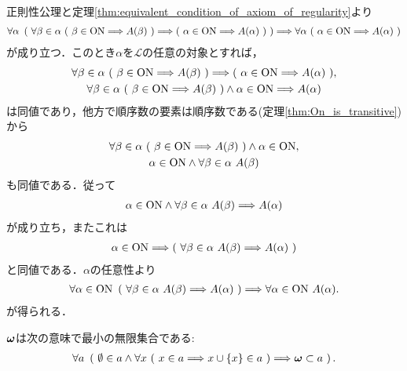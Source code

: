 	\begin{prf}
		正則性公理と定理\ref{thm:equivalent_condition_of_axiom_of_regularity}より
		\begin{align}
			\forall \alpha\ \left(\ \forall \beta \in \alpha\ (\ \beta \in \ON \Longrightarrow A(\beta)\ )
			\Longrightarrow (\ \alpha \in \ON \Longrightarrow A(\alpha)\ )\ \right)
			\Longrightarrow \forall \alpha\ (\ \alpha \in \ON \Longrightarrow A(\alpha)\ )
		\end{align}
		が成り立つ．このとき$\alpha$を$\mathcal{L}$の任意の対象とすれば，
		\begin{align}
			\begin{gathered}
				\forall \beta \in \alpha\ (\ \beta \in \mathrm{ON} \Longrightarrow A(\beta)\ )
				\Longrightarrow (\ \alpha \in \mathrm{ON} \Longrightarrow A(\alpha)\ ), \\
				\forall \beta \in \alpha\ (\ \beta \in \mathrm{ON} \Longrightarrow A(\beta)\ ) \wedge \alpha \in \mathrm{ON} \Longrightarrow A(\alpha)
			\end{gathered}
		\end{align}
		は同値であり，他方で順序数の要素は順序数である(定理\ref{thm:On_is_transitive})から
		\begin{align}
			\begin{gathered}
				\forall \beta \in \alpha\ (\ \beta \in \mathrm{ON} \Longrightarrow A(\beta)\ ) \wedge \alpha \in \mathrm{ON}, \\
				\alpha \in \mathrm{ON} \wedge \forall \beta \in \alpha\ A(\beta)
			\end{gathered}
		\end{align}
		も同値である．従って
		\begin{align}
			\alpha \in \mathrm{ON} \wedge \forall \beta \in \alpha\ A(\beta)
			\Longrightarrow A(\alpha)
		\end{align}
		が成り立ち，またこれは
		\begin{align}
			\alpha \in \mathrm{ON} \Longrightarrow \left(\ \forall \beta \in \alpha\ A(\beta)
			\Longrightarrow A(\alpha)\ \right)
		\end{align}
		と同値である．$\alpha$の任意性より
		\begin{align}
			\forall \alpha \in \ON\ 
			\left(\ \forall \beta \in \alpha\ A(\beta)
			\Longrightarrow A(\alpha)\ \right)
			\Longrightarrow \forall \alpha \in \ON\ A(\alpha).
		\end{align}
		が得られる．
		\QED
	\end{prf}

	\begin{screen}
		\begin{thm}
		\label{thm:the_principle_of_mathematical_induction}
			${\boldsymbol \omega}$は次の意味で最小の無限集合である:
			\begin{align}
				\forall a\ \left(\ \emptyset \in a \wedge \forall x\ 
				(\ x \in a \Longrightarrow x \cup \{x\} \in a\ ) 
				\Longrightarrow \omg \subset a\ \right).
			\end{align}
		\end{thm}
	\end{screen}
	
